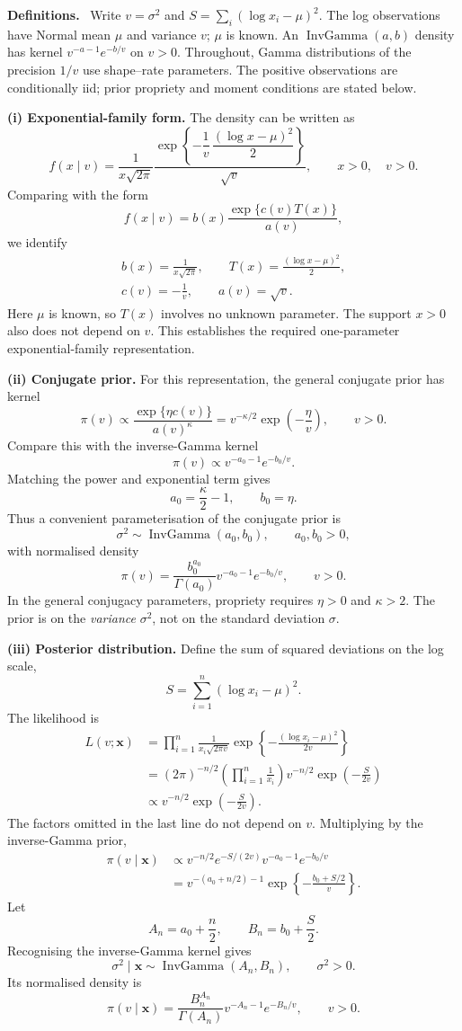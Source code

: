 \documentclass[11pt,a4paper]{article}
\newcommand{\xvec}{\boldsymbol{x}}
\DeclareMathOperator{\InvGamma}{InvGamma}
\newcommand{\studyheading}[1]{%
  \par\medskip\noindent\textcolor{statblue}{\textbf{#1.}}\ }
\begin{document}
\studyheading{Definitions}
Write $v=\sigma^2$ and $S=\sum_i(\log x_i-\mu)^2$.
The log observations have Normal mean $\mu$ and variance $v$; $\mu$ is known.
An $\InvGamma(a,b)$ density has kernel $v^{-a-1}e^{-b/v}$ on $v>0$.
Throughout, Gamma distributions of the precision $1/v$ use shape--rate parameters.
The positive observations are conditionally iid; prior propriety and moment conditions are stated below.

\textbf{(i) Exponential-family form.}
The density can be written as
\[
f(x\mid v)
=\frac1{x\sqrt{2\pi}}
\frac{\exp\!\left\{-\dfrac1v\,
\dfrac{(\log x-\mu)^2}{2}\right\}}{\sqrt v},
\qquad x>0,\quad v>0.
\]
Comparing with the form
\[
f(x\mid v)=b(x)\frac{\exp\{c(v)T(x)\}}{a(v)},
\]
we identify
\[
\boxed{
\begin{gathered}
b(x)=\frac1{x\sqrt{2\pi}},\qquad
T(x)=\frac{(\log x-\mu)^2}{2},\\
c(v)=-\frac1v,\qquad a(v)=\sqrt v.
\end{gathered}}
\]
Here $\mu$ is known, so $T(x)$ involves no unknown parameter. The support
$x>0$ also does not depend on $v$. This establishes the required
one-parameter exponential-family representation.

\textbf{(ii) Conjugate prior.}
For this representation, the general conjugate prior has kernel
\[
\pi(v)\propto\frac{\exp\{\eta c(v)\}}{a(v)^\kappa}
=v^{-\kappa/2}\exp\!\left(-\frac\eta v\right),\qquad v>0.
\]
Compare this with the inverse-Gamma kernel
\[
\pi(v)\propto v^{-a_0-1}e^{-b_0/v}.
\]
Matching the power and exponential term gives
\[
a_0=\frac\kappa2-1,\qquad b_0=\eta.
\]
Thus a convenient parameterisation of the conjugate prior is
\[
\boxed{\sigma^2\sim\InvGamma(a_0,b_0),\qquad a_0,b_0>0,}
\]
with normalised density
\[
\pi(v)=\frac{b_0^{a_0}}{\Gamma(a_0)}
v^{-a_0-1}e^{-b_0/v},\qquad v>0.
\]
In the general conjugacy parameters, propriety requires $\eta>0$ and
$\kappa>2$. The prior is on the \emph{variance} $\sigma^2$, not on the
standard deviation $\sigma$.

\textbf{(iii) Posterior distribution.}
Define the sum of squared deviations on the log scale,
\[
S=\sum_{i=1}^{n}(\log x_i-\mu)^2.
\]
The likelihood is
\[
\begin{aligned}
L(v;\xvec)
&=\prod_{i=1}^{n}\frac1{x_i\sqrt{2\pi v}}
\exp\!\left\{-\frac{(\log x_i-\mu)^2}{2v}\right\}\\
&=(2\pi)^{-n/2}\left(\prod_{i=1}^{n}\frac1{x_i}\right)
v^{-n/2}\exp\!\left(-\frac{S}{2v}\right)\\
&\propto v^{-n/2}\exp\!\left(-\frac{S}{2v}\right).
\end{aligned}
\]
The factors omitted in the last line do not depend on $v$. Multiplying
by the inverse-Gamma prior,
\[
\begin{aligned}
\pi(v\mid\xvec)
&\propto v^{-n/2}e^{-S/(2v)}v^{-a_0-1}e^{-b_0/v}\\
&=v^{-(a_0+n/2)-1}
\exp\!\left\{-\frac{b_0+S/2}{v}\right\}.
\end{aligned}
\]
Let
\[
A_n=a_0+\frac n2,\qquad B_n=b_0+\frac S2.
\]
Recognising the inverse-Gamma kernel gives
\[
\boxed{\sigma^2\mid\xvec\sim\InvGamma(A_n,B_n),\qquad\sigma^2>0.}
\]
Its normalised density is
\[
\pi(v\mid\xvec)=\frac{B_n^{A_n}}{\Gamma(A_n)}
v^{-A_n-1}e^{-B_n/v},\qquad v>0.
\]
\end{document}
